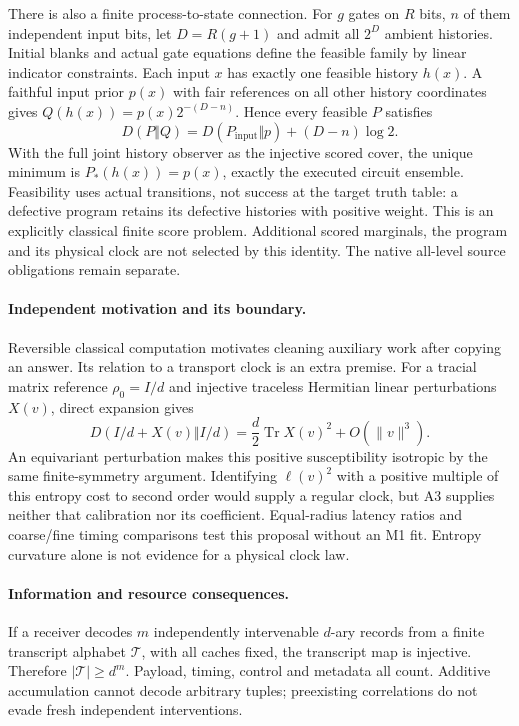 There is also a finite process-to-state connection. For $g$ gates on $R$
bits, $n$ of them independent input bits, let $D=R(g+1)$ and admit all
$2^D$ ambient histories. Initial blanks and actual gate equations define
the feasible family by linear indicator constraints. Each input $x$ has
exactly one feasible history $h(x)$. A faithful input prior $p(x)$ with fair
references on all other history coordinates gives
$Q(h(x))=p(x)2^{-(D-n)}$. Hence every feasible $P$ satisfies
\[
 D(P\Vert Q)=D(P_{\mathrm{input}}\Vert p)+(D-n)\log2.
\]
With the full joint history observer as the injective scored cover, the
unique minimum is $P_*(h(x))=p(x)$, exactly the executed circuit ensemble.
Feasibility uses actual transitions, not success at the target truth table:
a defective program retains its defective histories with positive weight.
This is an explicitly classical finite score problem. Additional scored
marginals, the program and its physical clock are not selected by this
identity. The native all-level source obligations remain separate.

\paragraph{Independent motivation and its boundary.}
Reversible classical computation motivates cleaning auxiliary work after
copying an answer. Its relation to a transport clock is an extra premise.
For a tracial matrix reference $\rho_0=I/d$ and injective traceless Hermitian
linear perturbations $X(v)$, direct expansion gives
\[
 D(I/d+X(v)\Vert I/d)=\frac d2\operatorname{Tr}X(v)^2+O(\|v\|^3).
\]
An equivariant perturbation makes this positive susceptibility isotropic by
the same finite-symmetry argument. Identifying $\ell(v)^2$ with a positive
multiple of this entropy cost to second order would supply a regular clock,
but A3 supplies neither that calibration nor its coefficient. Equal-radius
latency ratios and coarse/fine timing comparisons test this proposal without
an M1 fit. Entropy curvature alone is not evidence for a physical clock law.

\paragraph{Information and resource consequences.}
If a receiver decodes $m$ independently intervenable $d$-ary records from a
finite transcript alphabet $\mathcal T$, with all caches fixed, the transcript
map is injective. Therefore $|\mathcal T|\geq d^m$. Payload, timing, control
and metadata all count. Additive accumulation cannot decode arbitrary tuples;
preexisting correlations do not evade fresh independent interventions.

